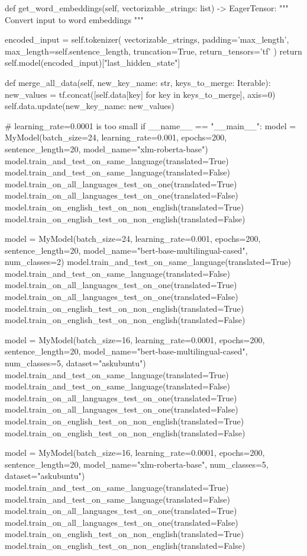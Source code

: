 \begin{python}
    def get_word_embeddings(self, vectorizable_strings: list) -> EagerTensor:
        """ Convert input to word embeddings
        """

        encoded_input = self.tokenizer(
            vectorizable_strings,
            padding='max_length',
            max_length=self.sentence_length,
            truncation=True,
            return_tensors='tf'
        )
        return self.model(encoded_input)["last_hidden_state"]

    def merge_all_data(self, new_key_name: str, keys_to_merge: Iterable):
        new_values = tf.concat([self.data[key] for key in keys_to_merge], axis=0)
        self.data.update({new_key_name: new_values})


# learning_rate=0.0001 is too small
if __name__ == "__main__":
    model = MyModel(batch_size=24, learning_rate=0.001, epochs=200, sentence_length=20, model_name="xlm-roberta-base")
    model.train_and_test_on_same_language(translated=True)
    model.train_and_test_on_same_language(translated=False)
    model.train_on_all_languages_test_on_one(translated=True)
    model.train_on_all_languages_test_on_one(translated=False)
    model.train_on_english_test_on_non_english(translated=True)
    model.train_on_english_test_on_non_english(translated=False)

    model = MyModel(batch_size=24, learning_rate=0.001, epochs=200, sentence_length=20,
                    model_name="bert-base-multilingual-cased", num_classes=2)
    model.train_and_test_on_same_language(translated=True)
    model.train_and_test_on_same_language(translated=False)
    model.train_on_all_languages_test_on_one(translated=True)
    model.train_on_all_languages_test_on_one(translated=False)
    model.train_on_english_test_on_non_english(translated=True)
    model.train_on_english_test_on_non_english(translated=False)


    model = MyModel(batch_size=16, learning_rate=0.0001, epochs=200, sentence_length=20,
                    model_name="bert-base-multilingual-cased", num_classes=5, dataset="askubuntu")
    model.train_and_test_on_same_language(translated=True)
    model.train_and_test_on_same_language(translated=False)
    model.train_on_all_languages_test_on_one(translated=True)
    model.train_on_all_languages_test_on_one(translated=False)
    model.train_on_english_test_on_non_english(translated=True)
    model.train_on_english_test_on_non_english(translated=False)
    
    model = MyModel(batch_size=16, learning_rate=0.0001, epochs=200, sentence_length=20,
                    model_name="xlm-roberta-base", num_classes=5, dataset="askubuntu")
    model.train_and_test_on_same_language(translated=True)
    model.train_and_test_on_same_language(translated=False)
    model.train_on_all_languages_test_on_one(translated=True)
    model.train_on_all_languages_test_on_one(translated=False)
    model.train_on_english_test_on_non_english(translated=True)
    model.train_on_english_test_on_non_english(translated=False)



\end{python}
